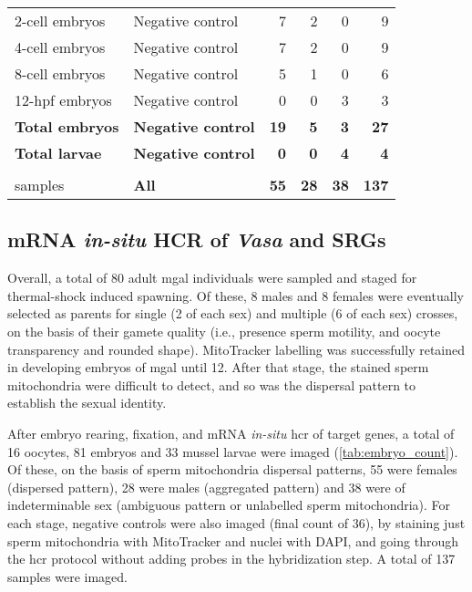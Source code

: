 {\begin{longtable}[c]{llrrrr}
    2-cell embryos                & Negative control                  & 7                & 2              & 0                     & 9              \\
    4-cell embryos                & Negative control                  & 7                & 2              & 0                     & 9              \\
    8-cell embryos                & Negative control                  & 5                & 1              & 0                     & 6              \\
    12-hpf embryos                & Negative control                  & 0                & 0              & 3                     & 3              \\
    \textbf{Total embryos}        & \textbf{Negative control}         & \textbf{19}      & \textbf{5}     & \textbf{3}            & \textbf{27}    \\* \midrule
    \textbf{Total larvae}         & \textbf{Negative control}         & \textbf{0}       & \textbf{0}     & \textbf{4}            & \textbf{4}     \\* \midrule \midrule
    \textbf{\begin{tabular}[c]{@{}l@{}}Total imaged\\ samples\end{tabular}} & \textbf{All}                      & \textbf{55}      & \textbf{28}    & \textbf{38}           & \textbf{137}  \\* \bottomrule \bottomrule
\end{longtable}
}

\subsection{mRNA \textit{in-situ} HCR of \textit{Vasa} and SRGs}
Overall, a total of 80 adult \gls{mgal} individuals were sampled and staged for thermal-shock induced spawning. Of these, 8 males and 8 females were eventually selected as parents for single (2 of each sex) and multiple (6 of each sex) crosses, on the basis of their gamete quality (i.e., presence sperm motility, and oocyte transparency and rounded shape). MitoTracker labelling was successfully retained in developing embryos of \gls{mgal} until \qty{12}{\hpf}. After that stage, the stained sperm mitochondria were difficult to detect, and so was the dispersal pattern to establish the sexual identity.

After embryo rearing, fixation, and mRNA \textit{in-situ} \gls{hcr} of target genes, a total of 16 oocytes, 81 embryos and 33 mussel larvae were imaged (\cref{tab:embryo_count}). Of these, on the basis of sperm mitochondria dispersal patterns, 55 were females (dispersed pattern), 28 were males (aggregated pattern) and 38 were of indeterminable sex (ambiguous pattern or unlabelled sperm mitochondria). For each stage, negative controls were also imaged (final count of 36), by staining just sperm mitochondria with MitoTracker and nuclei with DAPI, and going through the \gls{hcr} protocol without adding probes in the hybridization step. A total of 137 samples were imaged.

